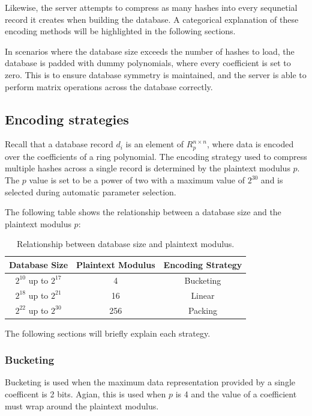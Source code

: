 Likewise, the server attempts to compress as many hashes into every sequnetial record it
creates when building the database. A categorical explanation of these encoding methods
will be highlighted in the following sections.

In scenarios where the database size exceeds the number of hashes to load, the database is
padded with dummy polynomials, where every coefficient is set to zero. This is to ensure
database symmetry is maintained, and the server is able to perform matrix operations
across the database correctly.

\subsection{Encoding strategies}

Recall that a database record $d_{i}$ is an element of $R_{p}^{n \times n}$, where data is
encoded over the coefficients of a ring polynomial. The encoding strategy used to compress
multiple hashes across a single record is determined by the plaintext modulus $p$. The $p$ value is set
to be a power of two with a maximum value of $2^{30}$ and is selected during automatic
parameter selection\cite{1}.

The following table shows the relationship between a database size and the plaintext modulus $p$:

\begin{table}[h]
    \centering
    \begin{tabular}{|c|c|c|}
        \hline
        Database Size & Plaintext Modulus & Encoding Strategy \\
        \hline
        $2^{10}$ up to $2^{17}$ & 4   & Bucketing \\
        $2^{18}$ up to $2^{21}$ & 16  & Linear \\
        $2^{22}$ up to $2^{30}$ & 256 & Packing \\
        \hline
    \end{tabular}
    \caption{Relationship between database size and plaintext modulus.}
    \label{tab:encoding_strategies}
\end{table}

The following sections will briefly explain each strategy.

\subsubsection{Bucketing}

Bucketing is used when the maximum data representation provided by a single coefficent is
2 bits. Agian, this is used when $p$ is 4 and the value of a coefficient must wrap around the
plaintext modulus.

